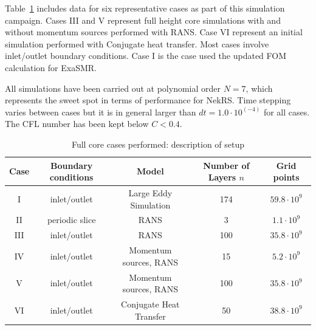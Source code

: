 Table~\ref{tab:full core} includes data for six representative cases as part of this simulation campaign. Cases III and V represent full height core simulations with and without momentum sources performed with RANS. Case VI represent an initial simulation performed with Conjugate heat transfer. Most cases involve inlet/outlet boundary conditions. Case I is the case used the updated FOM calculation for ExaSMR.

All simulations have been carried out at polynomial order $N=7$, which represents the sweet spot in terms of performance for NekRS. Time stepping varies between cases but it is in general larger than $dt=1.0 \cdot 10^(-4)$ for all cases. The CFL number has been kept below $C<0.4$.

\begin{table} \centering \small
 \begin{tabular}{ccccc} \hline \hline
  Case & Boundary conditions & Model & Number of Layers $n$ & Grid points \\ \hline
   I & inlet/outlet & Large Eddy Simulation & 174 & $59.8 \cdot 10^{9}$ \\
   II & periodic slice & RANS & 3 & $1.1 \cdot 10^{9}$ \\
   III & inlet/outlet & RANS & 100 & $35.8 \cdot 10^{9}$ \\
   IV & inlet/outlet & Momentum sources, RANS & 15 & $5.2 \cdot 10^{9}$ \\
   V & inlet/outlet & Momentum sources, RANS & 100 & $35.8 \cdot 10^{9}$ \\
   VI & inlet/outlet & Conjugate Heat Transfer & 50 & $38.8 \cdot 10^{9}$ \\
   \hline \hline
\end{tabular}
 \caption{Full core cases performed: description of setup}
 \label{tab:full core}
\end{table}
